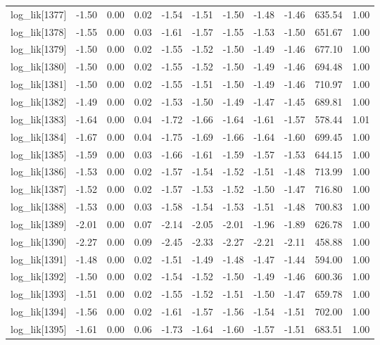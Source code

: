 \begin{table}[ht]
\begin{tabular}{rrrrrrrrrrr}
  log\_lik[1377] & -1.50 & 0.00 & 0.02 & -1.54 & -1.51 & -1.50 & -1.48 & -1.46 & 635.54 & 1.00 \\ 
  log\_lik[1378] & -1.55 & 0.00 & 0.03 & -1.61 & -1.57 & -1.55 & -1.53 & -1.50 & 651.67 & 1.00 \\ 
  log\_lik[1379] & -1.50 & 0.00 & 0.02 & -1.55 & -1.52 & -1.50 & -1.49 & -1.46 & 677.10 & 1.00 \\ 
  log\_lik[1380] & -1.50 & 0.00 & 0.02 & -1.55 & -1.52 & -1.50 & -1.49 & -1.46 & 694.48 & 1.00 \\ 
  log\_lik[1381] & -1.50 & 0.00 & 0.02 & -1.55 & -1.51 & -1.50 & -1.49 & -1.46 & 710.97 & 1.00 \\ 
  log\_lik[1382] & -1.49 & 0.00 & 0.02 & -1.53 & -1.50 & -1.49 & -1.47 & -1.45 & 689.81 & 1.00 \\ 
  log\_lik[1383] & -1.64 & 0.00 & 0.04 & -1.72 & -1.66 & -1.64 & -1.61 & -1.57 & 578.44 & 1.01 \\ 
  log\_lik[1384] & -1.67 & 0.00 & 0.04 & -1.75 & -1.69 & -1.66 & -1.64 & -1.60 & 699.45 & 1.00 \\ 
  log\_lik[1385] & -1.59 & 0.00 & 0.03 & -1.66 & -1.61 & -1.59 & -1.57 & -1.53 & 644.15 & 1.00 \\ 
  log\_lik[1386] & -1.53 & 0.00 & 0.02 & -1.57 & -1.54 & -1.52 & -1.51 & -1.48 & 713.99 & 1.00 \\ 
  log\_lik[1387] & -1.52 & 0.00 & 0.02 & -1.57 & -1.53 & -1.52 & -1.50 & -1.47 & 716.80 & 1.00 \\ 
  log\_lik[1388] & -1.53 & 0.00 & 0.03 & -1.58 & -1.54 & -1.53 & -1.51 & -1.48 & 700.83 & 1.00 \\ 
  log\_lik[1389] & -2.01 & 0.00 & 0.07 & -2.14 & -2.05 & -2.01 & -1.96 & -1.89 & 626.78 & 1.00 \\ 
  log\_lik[1390] & -2.27 & 0.00 & 0.09 & -2.45 & -2.33 & -2.27 & -2.21 & -2.11 & 458.88 & 1.00 \\ 
  log\_lik[1391] & -1.48 & 0.00 & 0.02 & -1.51 & -1.49 & -1.48 & -1.47 & -1.44 & 594.00 & 1.00 \\ 
  log\_lik[1392] & -1.50 & 0.00 & 0.02 & -1.54 & -1.52 & -1.50 & -1.49 & -1.46 & 600.36 & 1.00 \\ 
  log\_lik[1393] & -1.51 & 0.00 & 0.02 & -1.55 & -1.52 & -1.51 & -1.50 & -1.47 & 659.78 & 1.00 \\ 
  log\_lik[1394] & -1.56 & 0.00 & 0.02 & -1.61 & -1.57 & -1.56 & -1.54 & -1.51 & 702.00 & 1.00 \\ 
  log\_lik[1395] & -1.61 & 0.00 & 0.06 & -1.73 & -1.64 & -1.60 & -1.57 & -1.51 & 683.51 & 1.00 \\ 

\end{tabular}
\end{table}
